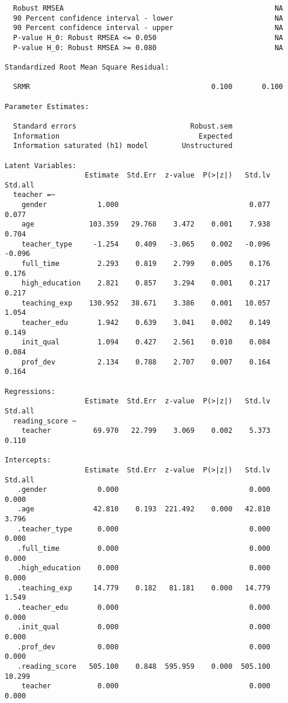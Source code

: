 \documentclass[
]{article}
\begin{document}
\begin{verbatim}
  Robust RMSEA                                                  NA
  90 Percent confidence interval - lower                        NA
  90 Percent confidence interval - upper                        NA
  P-value H_0: Robust RMSEA <= 0.050                            NA
  P-value H_0: Robust RMSEA >= 0.080                            NA

Standardized Root Mean Square Residual:

  SRMR                                           0.100       0.100

Parameter Estimates:

  Standard errors                           Robust.sem
  Information                                 Expected
  Information saturated (h1) model        Unstructured

Latent Variables:
                   Estimate  Std.Err  z-value  P(>|z|)   Std.lv  Std.all
  teacher =~                                                            
    gender            1.000                               0.077    0.077
    age             103.359   29.768    3.472    0.001    7.938    0.704
    teacher_type     -1.254    0.409   -3.065    0.002   -0.096   -0.096
    full_time         2.293    0.819    2.799    0.005    0.176    0.176
    high_education    2.821    0.857    3.294    0.001    0.217    0.217
    teaching_exp    130.952   38.671    3.386    0.001   10.057    1.054
    teacher_edu       1.942    0.639    3.041    0.002    0.149    0.149
    init_qual         1.094    0.427    2.561    0.010    0.084    0.084
    prof_dev          2.134    0.788    2.707    0.007    0.164    0.164

Regressions:
                   Estimate  Std.Err  z-value  P(>|z|)   Std.lv  Std.all
  reading_score ~                                                       
    teacher          69.970   22.799    3.069    0.002    5.373    0.110

Intercepts:
                   Estimate  Std.Err  z-value  P(>|z|)   Std.lv  Std.all
   .gender            0.000                               0.000    0.000
   .age              42.810    0.193  221.492    0.000   42.810    3.796
   .teacher_type      0.000                               0.000    0.000
   .full_time         0.000                               0.000    0.000
   .high_education    0.000                               0.000    0.000
   .teaching_exp     14.779    0.182   81.181    0.000   14.779    1.549
   .teacher_edu       0.000                               0.000    0.000
   .init_qual         0.000                               0.000    0.000
   .prof_dev          0.000                               0.000    0.000
   .reading_score   505.100    0.848  595.959    0.000  505.100   10.299
    teacher           0.000                               0.000    0.000


\end{verbatim}
\end{document}
